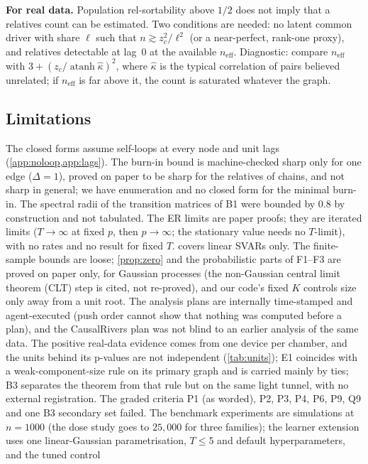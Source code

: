 \documentclass[pdflatex,sn-apa]{sn-jnl}
\theoremstyle{thmstyleone}
\theoremstyle{thmstylethree}
\theoremstyle{thmstyletwo}
\newcommand{\neff}{n_{\mathrm{eff}}}
\newcommand{\atanh}{\operatorname{atanh}}
\begin{document}
\textbf{For real data.} Population rel-sortability above $1/2$ does not imply
that a relatives count can be estimated. Two conditions are needed: no latent
common driver with share $\ell$ such that $n\gtrsim z_c^2/\ell^2$ (or a
near-perfect, rank-one proxy), and relatives detectable at lag~0 at the
available $\neff$. Diagnostic: compare $\neff$ with
$3+(z_c/\atanh\hat\kappa)^2$, where $\hat\kappa$ is the typical correlation of
pairs believed unrelated; if $\neff$ is far above it, the count is saturated
whatever the graph.

\subsection{Limitations}

The closed forms assume self-loops at every node and
unit lags (\cref{app:noloop,app:lags}). The burn-in bound is machine-checked sharp only
for one edge ($\Delta=1$), proved on paper to be sharp for the relatives of
chains, and not sharp in general; we have enumeration and no closed form for
the minimal burn-in. The spectral radii of the transition matrices of B1
were bounded by $0.8$ by construction and not tabulated. The ER limits are paper proofs; they are iterated limits ($T\to\infty$ at
fixed $p$, then $p\to\infty$; the stationary value needs no $T$-limit), with
no rates and no result for fixed $T$.  covers linear SVARs only.
The finite-sample bounds are loose; \cref{prop:zero} and the probabilistic
parts of F1--F3 are proved on paper only, for Gaussian processes (the
non-Gaussian central limit theorem (CLT) step is cited, not re-proved), and our code's fixed $K$
controls size only away from a unit root. The analysis plans are internally
time-stamped and agent-executed (push order cannot show that nothing was
computed before a plan), and the CausalRivers plan was not blind to an
earlier analysis of the same data. The positive real-data evidence comes from
one device per chamber, and the units behind its p-values are not independent
(\cref{tab:units}); E1 coincides with a weak-component-size rule on its
primary graph and is carried mainly by ties; B3 separates the theorem from
that rule but on the same light tunnel, with no external registration. The
graded criteria P1 (as worded), P2, P3, P4, P6, P9, Q9 and one B3 secondary set failed. The
benchmark experiments are simulations at $n=1000$ (the dose study goes to
$25{,}000$ for three families); the learner extension uses one linear-Gaussian
parametrisation, $T\le5$ and default hyperparameters, and the tuned control
\end{document}
